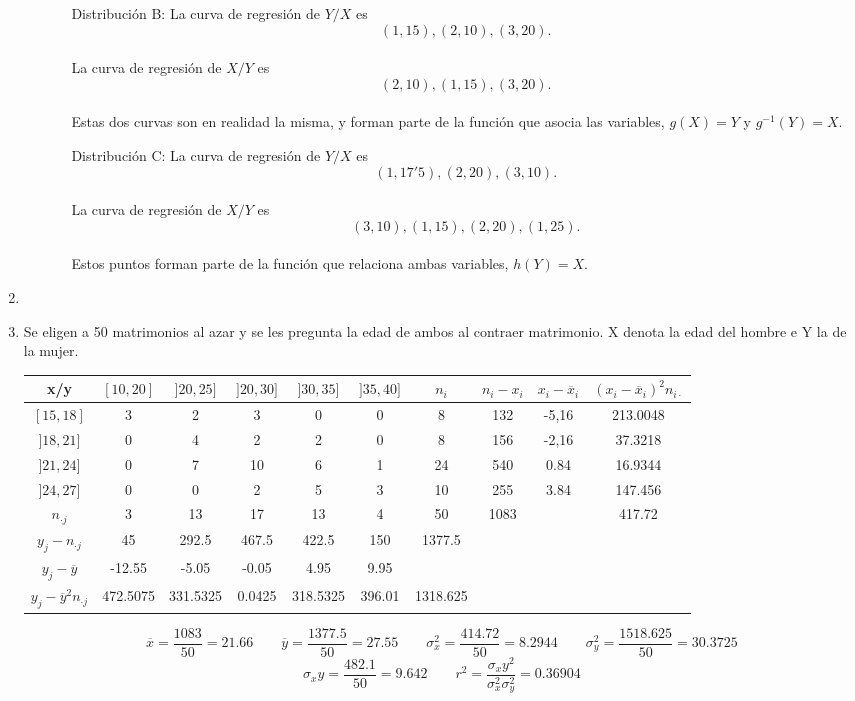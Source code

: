\documentclass[10pt,a4paper]{article}
\begin{document}
\begin{enumerate}
\begin{itemize}
\begin{itemize}
\item[Distribución B:]La curva de regresión de $Y/X$ es $$(1,15), (2,10), (3,20).$$
\\La curva de regresión de $X/Y$ es $$(2,10), (1,15), (3,20).$$
\\Estas dos curvas son en realidad la misma, y forman parte de la función que asocia las variables, $g(X) = Y$ y $g^{-1}(Y) = X$.

\item[Distribución C:]La curva de regresión de $Y/X$ es $$(1, 17'5), (2, 20), (3, 10).$$
\\La curva de regresión de $X/Y$ es $$(3, 10), (1, 15), (2, 20), (1, 25).$$
\\Estos puntos forman parte de la función que relaciona ambas variables, $h(Y) = X$.

\end{itemize}

\end{itemize}

\newpage

\item
\newpage

	\item Se eligen a 50 matrimonios al azar y se les pregunta la edad de ambos al contraer matrimonio.
	X denota la edad del hombre e Y la de la mujer.
	
	\begin{tabular}{|c|c|c|c|c|c|c|c|c|c|}
		\hline
		x/y	&$[10,20]$	&$]20,25]$	&$]20,30]$	&$]30,35]$	&$]35,40]$	&$n_i$	&$n_i-x_i$	&$x_i-\overline{x}_i$&$(x_i-\overline{x}_i)^2n_{i\cdot}$ \\ \hline
		$[15,18]$    & 3  & 2     & 3     & 0     & 0   & 8      & 132  & -5,16 & 213.0048 \\
		$]18,21]$    & 0  & 4     & 2     & 2     & 0   & 8      & 156  & -2,16 & 37.3218  \\
		$]21,24]$    & 0  & 7     & 10    & 6     & 1   & 24     & 540  & 0.84  & 16.9344  \\
		$]24,27]$    & 0  & 0     & 2     & 5     & 3   & 10     & 255  & 3.84  & 147.456  \\
		$n_{·j}$     & 3  & 13    & 17    & 13    & 4   & 50     & 1083 &       & 417.72   \\
		$y_j-n_{·j}$ & 45 & 292.5 & 467.5 & 422.5 & 150 & 1377.5 &&&\\
		$y_j-\overline{y}$ 
		         & -12.55 & -5.05 & -0.05 & 4.95  & 9.95 &&&&\\
		$y_j-\overline{y}^2n_{\cdot j}$
		         & 472.5075 & 331.5325 & 0.0425 & 318.5325 & 396.01 & 1318.625&&&\\
		\hline
	\end{tabular}
	$$
	\overline{x}=\frac{1083}{50}=21.66 \qquad 
	\overline{y}=\frac{1377.5}{50}=27.55 \qquad
	\sigma_{x}^2=\frac{414.72}{50}=8.2944 \qquad
	\sigma_{y}^2=\frac{1518.625}{50}=30.3725
	$$ 
	$$
	\sigma_xy=\frac{482.1}{50}=9.642 \qquad
	r^2=\frac{\sigma_xy^2}{\sigma_x^2\sigma_y^2}=0.36904
	$$
\newpage


\end{enumerate}
\end{document}
